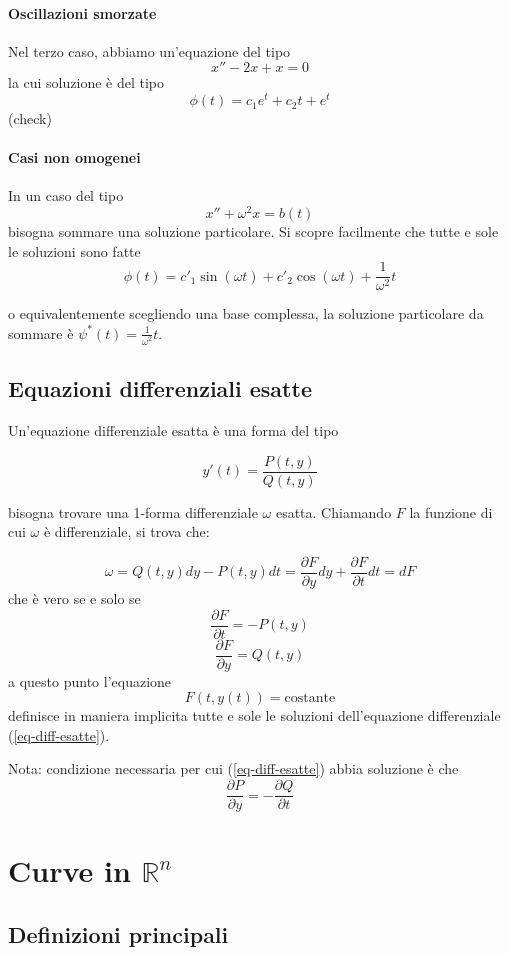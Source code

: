 \documentclass[a4paper,12pt]{article}
\begin{document}
\paragraph{Oscillazioni smorzate}
Nel terzo caso, abbiamo un'equazione del tipo
$$x''-2x +x=0$$
la cui soluzione è del tipo
$$\phi(t) = c_1e^t +c_2 t + e^t$$
(check)

\paragraph{Casi non omogenei}
In un caso del tipo
$$x''+\omega^2 x=b(t)$$
bisogna sommare una soluzione particolare. Si scopre facilmente che tutte e sole le soluzioni sono fatte
$$\phi(t) = c'_1\sin(\omega t) + c'_2\cos(\omega t) + \frac{1}{\omega^2}t$$

o equivalentemente scegliendo una base complessa, la soluzione particolare da sommare è $\psi^*(t) = \frac{1}{\omega^2}t$.

\subsection{Equazioni differenziali esatte}

Un'equazione differenziale esatta è una forma del tipo

\begin{equation}\label{eq-diff-esatte}
y'(t)=\frac{P(t, y)}{Q(t,y)} 
\end{equation}

bisogna trovare una 1-forma differenziale $\omega$ esatta. Chiamando $F$ la funzione di cui $\omega$ è differenziale, si trova che:

$$\omega = Q(t,y)dy - P(t,y)dt = \frac{\partial F}{\partial y}dy+\frac{\partial F}{\partial t}dt = dF$$
che è vero se e solo se
$$\frac{\partial F}{\partial t}=-P(t,y)$$
$$\frac{\partial F}{\partial y}=Q(t,y)$$
a questo punto l'equazione
$$F(t, y(t)) = \text{costante}$$
definisce in maniera implicita tutte e sole le soluzioni dell'equazione differenziale (\ref{eq-diff-esatte}).

Nota: condizione necessaria per cui (\ref{eq-diff-esatte}) abbia soluzione è che
$$\frac{\partial P}{\partial y}=-\frac{\partial Q}{\partial t}$$


\section{Curve in $\mathbb{R}^n$}
\subsection{Definizioni principali}
\end{document}
